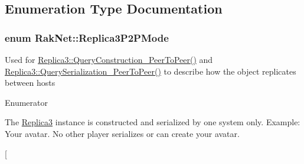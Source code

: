 \subsection{Enumeration Type Documentation}
\hypertarget{group___r_e_p_l_i_c_a___m_a_n_a_g_e_r___g_r_o_u_p3_ga91a588da9d58bc86b8fb7e4f27ddcf7e}{
\subsubsection[{Replica3\-P2\-P\-Mode}]{\setlength{\rightskip}{0pt plus 5cm}enum {\bf Rak\-Net\-::\-Replica3\-P2\-P\-Mode}}}\label{group___r_e_p_l_i_c_a___m_a_n_a_g_e_r___g_r_o_u_p3_ga91a588da9d58bc86b8fb7e4f27ddcf7e}
Used for \hyperlink{class_rak_net_1_1_replica3_abd7b33c48572729b624485e69e1f0fe2}{Replica3\-::\-Query\-Construction\-\_\-\-Peer\-To\-Peer()} and \hyperlink{class_rak_net_1_1_replica3_a212c9fff207005acf494fb9c4ae9e194}{Replica3\-::\-Query\-Serialization\-\_\-\-Peer\-To\-Peer()} to describe how the object replicates between hosts \begin{Desc}
\item[Enumerator]\par
\begin{description}
\item[{\em 
\hypertarget{group___r_e_p_l_i_c_a___m_a_n_a_g_e_r___g_r_o_u_p3_gga91a588da9d58bc86b8fb7e4f27ddcf7eae6bb229afa26313b6aa4c11320e630d5}{R3\-P2\-P\-M\-\_\-\-S\-I\-N\-G\-L\-E\-\_\-\-O\-W\-N\-E\-R}\label{group___r_e_p_l_i_c_a___m_a_n_a_g_e_r___g_r_o_u_p3_gga91a588da9d58bc86b8fb7e4f27ddcf7eae6bb229afa26313b6aa4c11320e630d5}
}]The \hyperlink{class_rak_net_1_1_replica3}{Replica3} instance is constructed and serialized by one system only. Example\-: Your avatar. No other player serializes or can create your avatar. \item[{\em 
}
\end{description}
\end{Desc}
